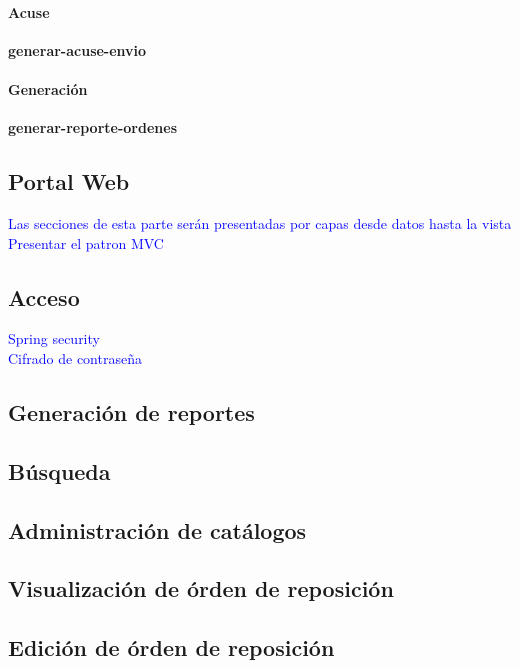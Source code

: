 	\paragraph{Acuse\\}
		\textbf{generar-acuse-envio}
	\paragraph{Generación\\}
 		\textbf{generar-reporte-ordenes}


\subsection{Portal Web}
\textcolor{blue}{Las secciones de esta parte serán presentadas por capas desde datos hasta la vista}\\
\textcolor{blue}{Presentar el patron MVC}\\
\subsection{Acceso}
\textcolor{blue}{Spring security}\\
\textcolor{blue}{Cifrado de contraseña}\\
\subsection{Generación de reportes}
\subsection{Búsqueda}

\subsection{Administración de catálogos}

\subsection{Visualización de órden de reposición}

\subsection{Edición de órden de reposición}














